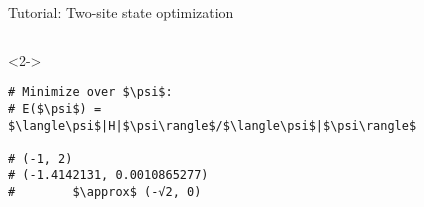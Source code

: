 \begin{frame}[fragile]{Tutorial: Two-site state optimization}
\begin{columns}
\begin{column}{5cm}
\begin{onlyenv}<2->

\begin{lstlisting}[style=julia, numbers=none, mathescape, basicstyle=\small]
# Minimize over $\psi$:
# E($\psi$) = $\langle\psi$|H|$\psi\rangle$/$\langle\psi$|$\psi\rangle$

# (-1, 2)
# (-1.4142131, 0.0010865277)
#        $\approx$ (-√2, 0)
\end{lstlisting}

\end{onlyenv}

\end{column}

\end{columns}

\end{frame}
